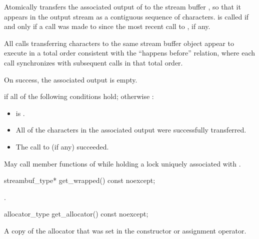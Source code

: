 \begin{itemdescr}
\pnum
\effects
Atomically transfers the associated output of 
to the stream buffer ,
so that it appears in the output stream
as a contiguous sequence of characters.
 is called
if and only if a call was made to 
since the most recent call to , if any.

\pnum
\sync
All  calls transferring characters
to the same stream buffer object
appear to execute in a total order
consistent with the ``happens before'' relation,
where each  call
synchronizes with
subsequent  calls in that total order.

\pnum
\ensures
On success, the associated output is empty.

\pnum
\returns
{} if all of the following conditions hold;
otherwise :
\begin{itemize}
\item {} is .
\item All of the characters in the associated output were successfully transferred.
\item The call to  (if any) succeeded.
\end{itemize}

\pnum
\remarks
May call member functions of 
while holding a lock uniquely associated with .
\end{itemdescr}

%
\begin{itemdecl}
streambuf_type* get_wrapped() const noexcept;
\end{itemdecl}

\begin{itemdescr}
\pnum
\returns
{}.
\end{itemdescr}

%
\begin{itemdecl}
allocator_type get_allocator() const noexcept;
\end{itemdecl}

\begin{itemdescr}
\pnum
\returns
A copy of the allocator that was set in the constructor or assignment operator.
\end{itemdescr}

